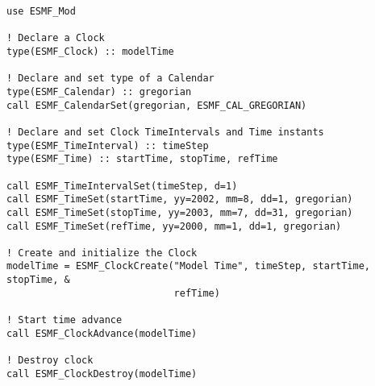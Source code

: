 
\begin{verbatim}
use ESMF_Mod

! Declare a Clock
type(ESMF_Clock) :: modelTime

! Declare and set type of a Calendar
type(ESMF_Calendar) :: gregorian
call ESMF_CalendarSet(gregorian, ESMF_CAL_GREGORIAN)

! Declare and set Clock TimeIntervals and Time instants
type(ESMF_TimeInterval) :: timeStep
type(ESMF_Time) :: startTime, stopTime, refTime

call ESMF_TimeIntervalSet(timeStep, d=1)
call ESMF_TimeSet(startTime, yy=2002, mm=8, dd=1, gregorian)
call ESMF_TimeSet(stopTime, yy=2003, mm=7, dd=31, gregorian)
call ESMF_TimeSet(refTime, yy=2000, mm=1, dd=1, gregorian)

! Create and initialize the Clock
modelTime = ESMF_ClockCreate("Model Time", timeStep, startTime, stopTime, &
                             refTime)

! Start time advance
call ESMF_ClockAdvance(modelTime)

! Destroy clock
call ESMF_ClockDestroy(modelTime)
\end{verbatim}
